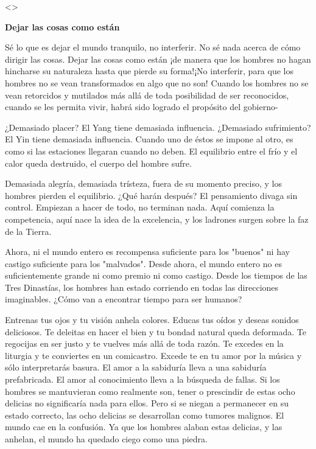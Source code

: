 \textless\textgreater{}

\textbf{{Dejar las cosas como están}}

Sé lo que es dejar el mundo tranquilo, no interferir. No sé nada acerca
de cómo dirigir las cosas. Dejar las cosas como están ¡de manera que los
hombres no hagan hincharse su naturaleza hasta que pierde su forma!¡No
interferir, para que los hombres no se vean transformados en algo que no
son! Cuando los hombres no se vean retorcidos y mutilados más allá de
toda posibilidad de ser reconocidos, cuando se les permita vivir, habrá
sido logrado el propósito del gobierno-

¿Demasiado placer? El Yang tiene demasiada influencia. ¿Demasiado
sufrimiento? El Yin tiene demasiada influencia. Cuando uno de éstos se
impone al otro, es como si las estaciones llegaran cuando no deben. El
equilibrio entre el frío y el calor queda destruido, el cuerpo del
hombre sufre.

Demasiada alegría, demasiada trísteza, fuera de su momento preciso, y
los hombres pierden el equilibrio. ¿Qué harán después? El pensamiento
divaga sin control. Empiezan a hacer de todo, no terminan nada. Aquí
comienza la competencia, aquí nace la idea de la excelencia, y los
ladrones surgen sobre la faz de la Tierra.

Ahora, ni el mundo entero es recompensa suficiente para los "buenos" ni
hay castigo suficiente para los "malvados". Desde ahora, el mundo entero
no es suficientemente grande ni como premio ni como castigo. Desde los
tiempos de las Tres Dinastías, los hombres han estado corriendo en todas
las direcciones imaginables. ¿Cómo van a encontrar tiempo para ser
humanos?

Entrenas tus ojos y tu visión anhela colores. Educas tus oídos y deseas
sonidos deliciosos. Te deleitas en hacer el bien y tu bondad natural
queda deformada. Te regocijas en ser justo y te vuelves más allá de toda
razón. Te excedes en la liturgia y te conviertes en un comicastro.
Excede te en tu amor por la música y sólo interpretarás basura. El amor
a la sabiduría lleva a una sabiduría prefabricada. El amor al
conocimiento lleva a la búsqueda de fallas. Si los hombres se
mantuvieran como realmente son, tener o prescindir de estas ocho
delicias no significaría nada para ellos. Pero si se niegan a permanecer
en su estado correcto, las ocho delicias se desarrollan como tumores
malignos. El mundo cae en la confusión. Ya que los hombres alaban estas
delicias, y las anhelan, el mundo ha quedado ciego como una piedra.

